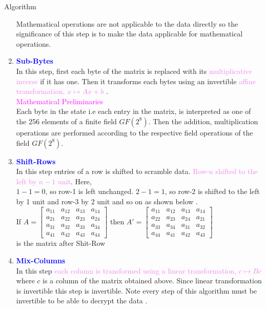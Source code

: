 \documentclass{beamer}
\begin{document}
\begin{frame}[allowframebreaks]{Algorithm}
\begin{enumerate}
    Mathematical operations are not applicable to the data directly so the significance of this step is to make the data applicable for mathematical operations.
  \item \textbf{\textcolor{blue}{Sub-Bytes}}\\
    In this step, first each byte of the matrix is replaced with its \textcolor{violet}{multiplicative inverse} if it has one. Then it transforms each bytes using an invertible \textcolor{violet}{affine transformation, \(x \mapsto Ax+b\)} \cite{aes}.\\
    \framebreak
    \textcolor{magenta}{Mathematical Preliminaries}\\
    Each byte in the state i.e each entry in the matrix, is interpreted as one of the 256 elements of a finite field \(GF(2^8)\). Then the addition, multiplication operations are performed according to the respective field operations of the field \(GF(2^8)\).
\vspace{2mm}
    \item \textbf{\textcolor{blue}{Shift-Rows}}\\
In this step entries of a row is shifted to scramble data. \textcolor{violet}{Row-n shifted to the left by \(n-1\) unit}. Here,\\
\(1-1=0\), so row-1 is left unchanged. \(2-1=1\), so row-2 is shifted to the left by 1 unit and row-3 by 2 unit and so on as shown below \cite{aes}.\\
\vspace{3mm}
If \(A=\begin{bmatrix}
    a_{11}&a_{12}&a_{13}&a_{14}\\
    a_{21}&a_{22}&a_{23}&a_{24}\\
    a_{31}&a_{32}&a_{33}&a_{34}\\
    a_{41}&a_{42}&a_{43}&a_{44}
    \end{bmatrix}\) \hspace{3mm} then \(A'=\begin{bmatrix}
    a_{11}&a_{12}&a_{13}&a_{14}\\
    a_{22}&a_{23}&a_{24}&a_{21}\\
    a_{33}&a_{34}&a_{31}&a_{32}\\
    a_{44}&a_{41}&a_{42}&a_{43}
  \end{bmatrix}\) \vspace{2mm} \\[3mm] is the matrix after Shit-Row

    \framebreak

  \item \textbf{\textcolor{blue}{Mix-Columns}}\\
    In this step \textcolor{violet}{each column is transformed using a linear transformation, \(c \mapsto Bc\)} where \(c\) is a column of the matrix obtained above. Since linear transformation is invertible this step is invertible. Note every step of this algorithm must be invertible to be able to decrypt the data \cite{aes}.


\end{enumerate}
\end{frame}
\end{document}
